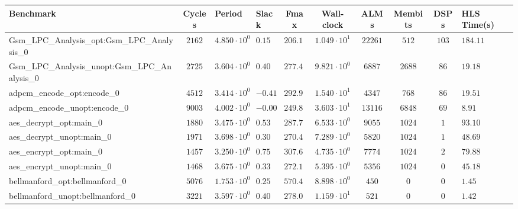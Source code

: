 \begin{tabular}{|l|c|HHc|c|c|c|cH|}
\hline
Benchmark                                       & Cycles       & Period                 & Slack     & Fmax       & Wall-clock              & ALMs       & Membits     & DSPs    & HLS Time(s) \\
\hline
Gsm\_LPC\_Analysis\_opt:Gsm\_LPC\_Analysis\_0   & $ 2162     $ & $ 4.850 \cdot 10^{0} $ & $ 0.15  $ & $ 206.19 $ & $ 1.049 \cdot 10^{1}  $ & $ 22261  $ & $ 512     $ & $ 103 $ & $ 184.11  $ \\
Gsm\_LPC\_Analysis\_unopt:Gsm\_LPC\_Analysis\_0 & $ 2725     $ & $ 3.604 \cdot 10^{0} $ & $ 0.40  $ & $ 277.47 $ & $ 9.821 \cdot 10^{0}  $ & $ 6887   $ & $ 2688    $ & $ 86  $ & $ 19.18   $ \\
adpcm\_encode\_opt:encode\_0                    & $ 4512     $ & $ 3.414 \cdot 10^{0} $ & $ -0.41 $ & $ 292.91 $ & $ 1.540 \cdot 10^{1}  $ & $ 4347   $ & $ 768     $ & $ 86  $ & $ 19.51   $ \\
adpcm\_encode\_unopt:encode\_0                  & $ 9003     $ & $ 4.002 \cdot 10^{0} $ & $ -0.00 $ & $ 249.88 $ & $ 3.603 \cdot 10^{1}  $ & $ 13116  $ & $ 6848    $ & $ 69  $ & $ 8.91    $ \\
aes\_decrypt\_opt:main\_0                       & $ 1880     $ & $ 3.475 \cdot 10^{0} $ & $ 0.53  $ & $ 287.77 $ & $ 6.533 \cdot 10^{0}  $ & $ 9055   $ & $ 1024    $ & $ 1   $ & $ 93.10   $ \\
aes\_decrypt\_unopt:main\_0                     & $ 1971     $ & $ 3.698 \cdot 10^{0} $ & $ 0.30  $ & $ 270.42 $ & $ 7.289 \cdot 10^{0}  $ & $ 5820   $ & $ 1024    $ & $ 1   $ & $ 48.69   $ \\
aes\_encrypt\_opt:main\_0                       & $ 1457     $ & $ 3.250 \cdot 10^{0} $ & $ 0.75  $ & $ 307.69 $ & $ 4.735 \cdot 10^{0}  $ & $ 7774   $ & $ 1024    $ & $ 2   $ & $ 79.88   $ \\
aes\_encrypt\_unopt:main\_0                     & $ 1468     $ & $ 3.675 \cdot 10^{0} $ & $ 0.33  $ & $ 272.11 $ & $ 5.395 \cdot 10^{0}  $ & $ 5356   $ & $ 1024    $ & $ 0   $ & $ 45.18   $ \\
bellmanford\_opt:bellmanford\_0                 & $ 5076     $ & $ 1.753 \cdot 10^{0} $ & $ 0.25  $ & $ 570.45 $ & $ 8.898 \cdot 10^{0}  $ & $ 450    $ & $ 0       $ & $ 0   $ & $ 1.45    $ \\
bellmanford\_unopt:bellmanford\_0               & $ 3221     $ & $ 3.597 \cdot 10^{0} $ & $ 0.40  $ & $ 278.01 $ & $ 1.159 \cdot 10^{1}  $ & $ 521    $ & $ 0       $ & $ 0   $ & $ 1.42    $ \\

\end{tabular}
